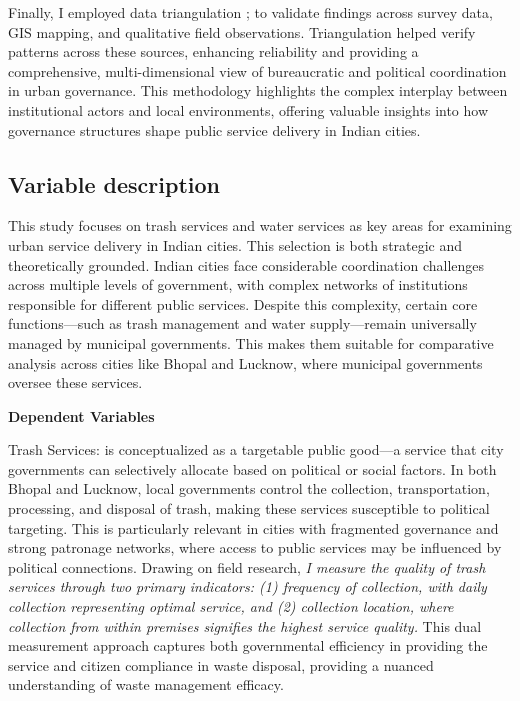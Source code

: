 Finally, I employed data triangulation \citep{denzin_research_2017}; \citep{patton_enhancing_1999} to validate findings across survey data, GIS mapping, and qualitative field observations. Triangulation helped verify patterns across these sources, enhancing reliability and providing a comprehensive, multi-dimensional view of bureaucratic and political coordination in urban governance. This methodology highlights the complex interplay between institutional actors and local environments, offering valuable insights into how governance structures shape public service delivery in Indian cities.

\subsection{Variable description} 


This study focuses on trash services and water services as key areas for examining urban service delivery in Indian cities. This selection is both strategic and theoretically grounded. Indian cities face considerable coordination challenges across multiple levels of government, with complex networks of institutions responsible for different public services. Despite this complexity, certain core functions—such as trash management and water supply—remain universally managed by municipal governments. This makes them suitable for comparative analysis across cities like Bhopal and Lucknow, where municipal governments oversee these services. 

\vspace{5mm}
\textbf{Dependent Variables}

Trash Services: is conceptualized as a targetable public good—a service that city governments can selectively allocate based on political or social factors. In both Bhopal and Lucknow, local governments control the collection, transportation, processing, and disposal of trash, making these services susceptible to political targeting. This is particularly relevant in cities with fragmented governance and strong patronage networks, where access to public services may be influenced by political connections. Drawing on field research, \textit{I measure the quality of trash services through two primary indicators: (1) frequency of collection, with daily collection representing optimal service, and (2) collection location, where collection from within premises signifies the highest service quality.} This dual measurement approach captures both governmental efficiency in providing the service and citizen compliance in waste disposal, providing a nuanced understanding of waste management efficacy.

